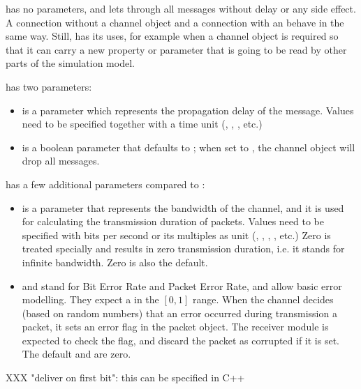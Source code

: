  has no parameters, and lets through all messages without
delay or any side effect. A connection without a channel object
and a connection with an  behave in the same way.
Still,  has its uses, for example when a channel object
is required so that it can carry a new property or parameter that is
going to be read by other parts of the simulation model.

 has two parameters:

\begin{itemize}
    \item {} is a  parameter which represents the
          propagation delay of the message. Values need to be specified
          together with a time unit (, , , etc.)
    \item {} is a boolean parameter that defaults to ;
          when set to , the channel object will drop all messages.
\end{itemize}

 has a few additional parameters compared to :

\begin{itemize}
    \item {} is a  parameter that represents the
          bandwidth of the channel, and it is used for calculating the
          transmission duration of packets. Values need to be specified
          with bits per second or its multiples as unit (,
          , , , etc.) Zero is treated
          specially and results in zero transmission duration, i.e.
          it stands for infinite bandwidth. Zero is also the default.
    \item {} and  stand for Bit Error Rate and Packet Error Rate,
          and allow basic error modelling. They expect a 
          in the $[0,1]$ range. When the channel decides (based on random
          numbers) that an error occurred during transmission a packet,
          it sets an error flag in the packet object. The receiver
          module is expected to check the flag, and discard the packet
          as corrupted if it is set. The default  and 
          are zero.
\end{itemize}

\begin{note}
    XXX "deliver on first bit": this can be specified in C++
\end{note}

